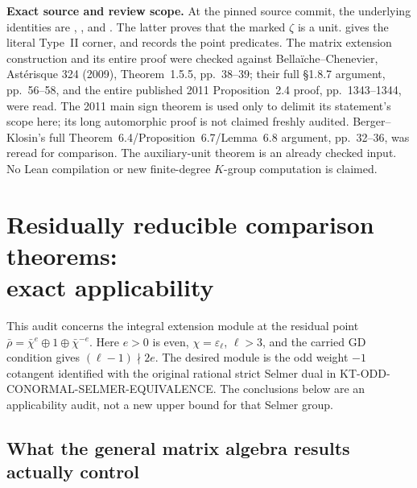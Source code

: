 \documentclass[11pt,a4paper]{article}
\theoremstyle{definition}
\renewcommand{\paragraph}[1]{\par\smallskip\noindent\textbf{#1}\quad\ignorespaces}
\begin{document}
\paragraph{Exact source and review scope.}
At the pinned source commit, the underlying identities are
,
, and
.
The latter proves that the marked $\zeta$ is a unit.
 gives
the literal Type~II corner, and
 records the point predicates.
The matrix extension construction and its entire proof were
checked against Bella\"iche--Chenevier, Ast\'erisque 324
(2009), Theorem~1.5.5, pp.~38--39; their full
\S1.8.7 argument, pp.~56--58, and the entire published
2011 Proposition~2.4 proof, pp.~1343--1344, were read.
The 2011 main sign theorem is used only to delimit its
statement's scope here; its long automorphic proof is not
claimed freshly audited.  Berger--Klosin's full
Theorem~6.4/Proposition~6.7/Lemma~6.8 argument, pp.~32--36,
was reread for comparison.  The auxiliary-unit theorem
is an already checked input.  No Lean compilation or
new finite-degree $K$-group computation is claimed.



\section[Residually reducible comparison theorems: exact applicability]{Residually reducible comparison theorems:\\exact applicability}
\label{sec:kt-reducible-comparison}

This audit concerns the integral extension module at the residual
point $\bar\rho=\bar\chi^e\oplus1\oplus\bar\chi^{-e}$.
Here $e>0$ is even, $\chi=\varepsilon_\ell$, $\ell>3$, and the
carried GD condition gives $(\ell-1)\nmid2e$.  The desired module
is the odd weight $-1$ cotangent identified with the original
rational strict Selmer dual in KT-ODD-CONORMAL-SELMER-EQUIVALENCE.
The conclusions below are an applicability audit, not a new
upper bound for that Selmer group.

\subsection{What the general matrix algebra results actually control}
\end{document}
